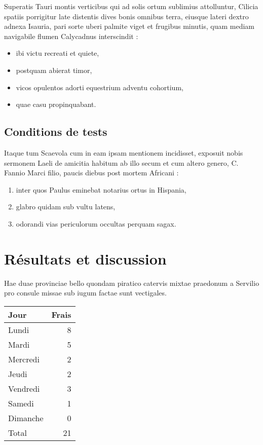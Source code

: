 \documentclass[french]{report}
\begin{document}
Superatis Tauri montis verticibus qui ad solis ortum sublimius attolluntur,
Cilicia spatiis porrigitur late distentis dives bonis omnibus terra, eiusque
lateri dextro adnexa Isauria, pari sorte uberi palmite viget et frugibus
minutis, quam mediam navigabile flumen Calycadnus interscindit :

\begin{itemize}
\item ibi victu recreati et quiete,
\item postquam abierat timor,
\item vicos opulentos adorti equestrium adventu cohortium,
\item quae casu propinquabant.
\end{itemize}

\chapter{Conditions de tests}
\label{sec:org9569e0c}

Itaque tum Scaevola cum in eam ipsam mentionem incidisset, exposuit nobis
sermonem Laeli de amicitia habitum ab illo secum et cum altero genero, C. Fannio
Marci filio, paucis diebus post mortem Africani :

\begin{enumerate}
\item inter quos Paulus eminebat notarius ortus in Hispania,
\item glabro quidam sub vultu latens,
\item odorandi vias periculorum occultas perquam sagax.
\end{enumerate}

\part{Résultats et discussion}
\label{sec:org8c07454}

Hae duae provinciae bello quondam piratico catervis mixtae praedonum a Servilio
pro consule missae sub iugum factae sunt vectigales.

\begin{table}[!htbp]
\label{tab:org31773b8}
\centering
\begin{tabular}{lr}
Jour & Frais\\
\hline
Lundi & 8\\
Mardi & 5\\
Mercredi & 2\\
Jeudi & 2\\
Vendredi & 3\\
Samedi & 1\\
Dimanche & 0\\
\hline
Total & 21\\
\end{tabular}
\end{table}
\end{document}

